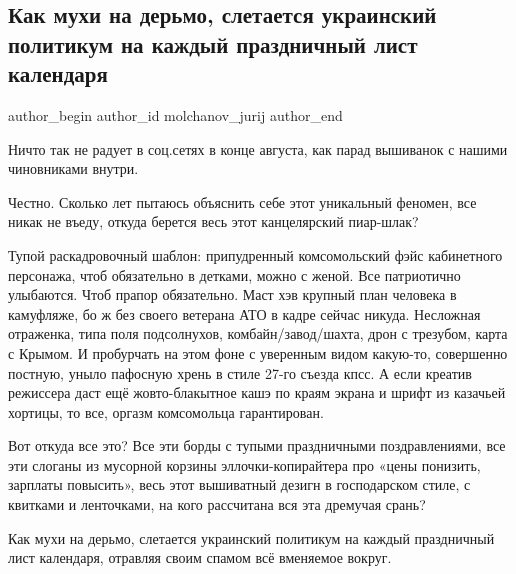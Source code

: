  
 
 
 
 
 
\subsection{Как мухи на дерьмо, слетается украинский политикум на каждый праздничный лист календаря}
\label{sec:29_08_2021.fb.molchanov_jurij.1.pokazuha}
 
\ifcmt
 author_begin
   author_id molchanov_jurij
 author_end
\fi

Ничто так не радует в соц.сетях в конце августа, как парад вышиванок с нашими
чиновниками внутри. 

Честно. Сколько лет пытаюсь объяснить себе этот уникальный феномен, все никак
не въеду, откуда берется весь этот канцелярский пиар-шлак?

Тупой раскадровочный шаблон: припудренный комсомольский фэйс кабинетного
персонажа, чтоб обязательно в детками, можно с женой. Все патриотично
улыбаются. Чтоб прапор обязательно. Маст хэв крупный план человека в камуфляже,
бо ж без своего ветерана АТО в кадре сейчас никуда. Несложная отраженка, типа
поля подсолнухов, комбайн/завод/шахта, дрон с трезубом, карта с Крымом. И
пробурчать на этом фоне с уверенным видом какую-то, совершенно постную, уныло
пафосную хрень в стиле 27-го съезда кпсс. А если креатив режиссера даст ещё
жовто-блакытное кашэ по краям экрана и шрифт из казачьей хортицы, то все,
оргазм комсомольца гарантирован.

Вот откуда все это? Все эти борды с тупыми праздничными поздравлениями, все эти
слоганы из мусорной корзины эллочки-копирайтера про «цены понизить, зарплаты
повысить», весь этот вышиватный дезигн в господарском стиле, с квитками и
ленточками, на кого рассчитана вся эта дремучая срань?

Как мухи на дерьмо, слетается украинский политикум на каждый праздничный лист
календаря, отравляя своим спамом всё вменяемое вокруг.


